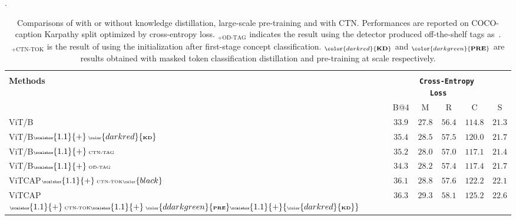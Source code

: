 \begin{table}[t]
    \centering
    \renewcommand{\arraystretch}{1.2} .
    \caption[Comparisons of \vitcapp with or without knowledge distillation.]{\small Comparisons of \vitcapp with or without knowledge distillation, large-scale pre-training and with CTN. Performances are reported on COCO-caption Karpathy split optimized by cross-entropy loss. $_{+ \text{OD-TAG}}$ indicates the result using the detector produced off-the-shelf tags as~\citep{li2020oscar}. $_{+ \text{CTN-TOK}}$ is the result of \vitcapp using the initialization after first-stage concept classification. $_{\color{darkred}{\text{\textbf{KD}}}}$ and $_{\color{darkgreen}{\text{\textbf{PRE}}}}$ are results obtained with masked token classification distillation and pre-training at scale respectively.
    }    
    \scalebox{0.95}
    {\small
    \begin{tabular}{p{43.5mm} c c c c c }
    \toprule
    \\[-3.5ex]
   \multirow{2}{*}{\textbf{Methods}} & \multicolumn{4}{c}{{\texttt{\textbf{\ \ \ \ Cross-Entropy Loss}}}} \\
    & \multicolumn{1}{c}{B@4 } & M & R  & C     & \multicolumn{1}{c}{S}    \\	
    \hline
    \cellcolor{red!3}ViT/B&   \cellcolor{gray!5}$33.9$ & $27.8$ & $56.4$ &  \cellcolor{gray!5}$114.8$ & $21.3$ \\
    \cellcolor{red!3}ViT/B${\tiny  \scalebox{1.1}{+} \  \color{darkred}{\text{\textbf{KD}}}}$ &   \cellcolor{gray!20}$35.4$ & $28.5$ & $57.5$ & \cellcolor{gray!40}$120.0$ & $21.7$   \\
    \cellcolor{red!3}ViT/B${\tiny \scalebox{1.1}{+} \ \text{CTN-TAG}}$ &    \cellcolor{gray!15}$35.2$ &  $28.0$ & $57.0$ &	\cellcolor{gray!25}$117.1$ & $21.4$ \\
    \cellcolor{red!3}ViT/B${\tiny \scalebox{1.1}{+} \ \text{OD-TAG}}$ &    \cellcolor{gray!10}$34.3$ &  $28.2$ & $57.4$	& \cellcolor{gray!25}$117.4$ & $21.7$\\
    \cellcolor{red!3}ViTCAP${\tiny \scalebox{1.1}{+} \ \text{CTN-TOK}{\color{black}}}$ &    \cellcolor{gray!25}$36.1$ &  $28.8$ & $57.6$	& \cellcolor{gray!35}$122.2$ & $22.1$\\
    \cellcolor{red!3}ViTCAP${\tiny \scalebox{1.1}{+} \ \text{CTN-TOK}  \scalebox{1.1}{+} \ {\color{ddarkgreen}{\text{\textbf{PRE}}}} \scalebox{1.1}{+} {\color{darkred}{\text{\textbf{KD}}}} }$ &  \cellcolor{gray!35}$36.3$ &  $29.3$ & $58.1$ & \cellcolor{gray!45}$125.2$ & $22.6$   \\
    \bottomrule
    \end{tabular}
    }
  \label{tab:ablation}
\end{table}
